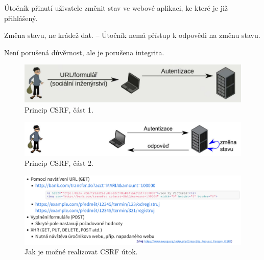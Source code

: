 \begin{compactitem}
    \item Útočník přinutí uživatele změnit stav ve webové aplikaci, ke které je již přihlášený.
    \item Změna stavu, ne krádež dat. -- Útočník nemá přístup k odpovědi na změnu stavu.
    \item Není porušená důvěrnost, ale je porušena integrita.

    \begin{figure}[H]
        \centering
        \includegraphics[width=1\linewidth]{csrf_1.pdf}
        \caption{Princip CSRF, část 1.}
    \end{figure}

    \begin{figure}[H]
        \centering
        \includegraphics[width=1\linewidth]{csrf_2.pdf}
        \caption{Princip CSRF, část 2.}
    \end{figure}

    \begin{figure}[H]
        \centering
        \includegraphics[width=1\linewidth]{csrf_realizace.pdf}
        \caption{Jak je možné realizovat CSRF útok.}
    \end{figure}


\end{compactitem}
